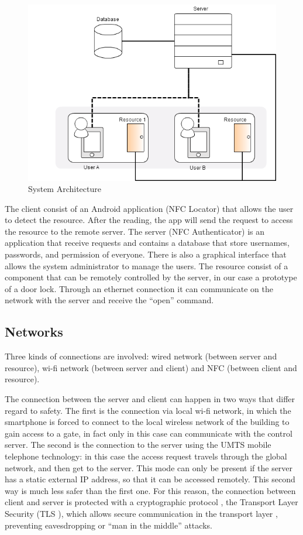 \documentclass[conference]{IEEEtran}
\begin{document}
\begin{figure}[h]
\centering
\includegraphics[scale=0.4]{fig1}
\caption{System Architecture}
\label{fig_sim}
\end{figure}

The client consist of an Android application (NFC Locator) that allows the user to detect the resource. After the reading, the app will send the request to access the resource to the remote server.
The server (NFC Authenticator) is an application that receive requests and contains a database that store usernames, passwords, and permission of everyone.  There is also a graphical interface that allows the system administrator to manage the users.
The resource consist of a component that can be remotely controlled by the server, in our case a prototype of a door lock. Through an ethernet connection it can communicate on the network with the server and receive the “open” command.

\subsection{Networks}

Three kinds of connections are involved: wired network (between server and resource), wi-fi network (between server and client) and NFC (between client and resource).

The connection between the server and client can happen in two ways that differ regard to safety. The first is the connection via local wi-fi network, in which the smartphone is forced to connect to the local wireless network of the building to gain access to a gate, in fact only in this case can communicate with the control server. The second is the connection to the server using the UMTS mobile telephone technology: in this case the access request travels through the global network, and then get to the server. This mode can only be present if the server has a static external IP address, so that it can be accessed remotely. This second way is much less safer than the first one. For this reason, the connection between client and server is protected with a cryptographic protocol , the Transport Layer Security (TLS ), which allows secure communication in the transport layer , preventing eavesdropping or “man in the middle” attacks. 
\end{document}

